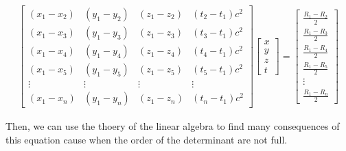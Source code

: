 \documentclass[runningheads,a4paper]{llncs}
\begin{document}
	\begin{equation}
	\begin{split}
	\label{10}
	\begin{bmatrix}
	(x_1-x_2)&(y_1-y_2)&(z_1-z_2)&(t_2-t_1)c^2\\
	(x_1-x_3)&(y_1-y_3)&(z_1-z_3)&(t_3-t_1)c^2\\
	(x_1-x_4)&(y_1-y_4)&(z_1-z_4)&(t_4-t_1)c^2\\
	(x_1-x_5)&(y_1-y_5)&(z_1-z_5)&(t_5-t_1)c^2\\
	\vdots&\vdots&\vdots&\vdots\\
	(x_1-x_n)&(y_1-y_n)&(z_1-z_n)&(t_n-t_1)c^2
	\end{bmatrix}
	\begin{bmatrix}
	x\\ y\\ z\\ t
	\end{bmatrix}
	=
	\begin{bmatrix}
	\frac{R_1-R_2}{2}\\
	\frac{R_1-R_3}{2}\\
	\frac{R_1-R_4}{2}\\
	\frac{R_1-R_5}{2}\\
	\vdots\\
	\frac{R_1-R_n}{2}
	\end{bmatrix}
	\end{split}
	\end{equation}
	
	Then, we can use the thoery of the linear algebra to find many consequences of this equation cause when the order of the determinant are not full.
	
	
	
	
\end{document}
